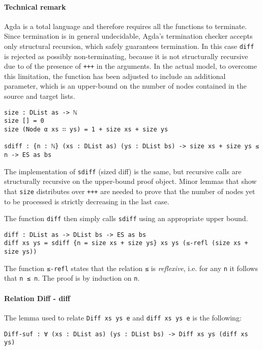 \documentclass[../Thesis.tex]{subfiles}
\begin{document}
	\paragraph{Technical remark}
	Agda is a total language and therefore requires all the functions to 
	terminate. Since termination is in general undecidable, Agda's termination 
	checker accepts only structural recursion, which safely guarantees
	termination. In this case \texttt{diff} is rejected as possibly 
	non-terminating, because it is not structurally recursive
	due to of the presence of \texttt{+++} in the arguments. 
	In the actual model, to overcome this limitation, the function has been 
	adjusted to include an additional parameter, which is an upper-bound 
	on the number of nodes contained in the source and target lists.

\begin{verbatim}
size : DList as -> ℕ 
size [] = 0
size (Node α xs ∷ ys) = 1 + size xs + size ys

sdiff : {n : ℕ} (xs : DList as) (ys : DList bs) -> size xs + size ys ≤ n -> ES as bs
\end{verbatim}
	
	The implementation of \texttt{sdiff} (sized diff) is the same, but recursive 
	calls	are structurally recursive on the upper-bound proof object.
	Minor lemmas that show that \texttt{size} distributes over \texttt{+++}
	are needed to prove that the number of nodes yet to be processed
	is strictly decreasing in the last case.

	The function \texttt{diff} then simply calls \texttt{sdiff} using an appropriate
	upper bound.
		
\begin{verbatim}
diff : DList as -> DList bs -> ES as bs
diff xs ys = sdiff {n = size xs + size ys} xs ys (≤-refl (size xs + size ys))
\end{verbatim}

	The function \texttt{≤-refl} states that the relation \texttt{≤} is 
	\emph{reflexive}, i.e. for any \texttt{n} it follows that \texttt{n ≤ n}.
	The proof is by induction on \texttt{n}.	 

	\paragraph{Relation Diff - diff} 	
	
	The lemma used to relate \texttt{Diff xs ys e} and \texttt{diff xs ys e} 
	is the following:
\begin{verbatim}	
Diff-suf : ∀ (xs : DList as) (ys : DList bs) -> Diff xs ys (diff xs ys)
\end{verbatim}
\end{document}
